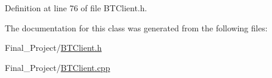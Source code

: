 Definition at line 76 of file B\-T\-Client.\-h.



The documentation for this class was generated from the following files\-:\begin{DoxyCompactItemize}
\item 
Final\-\_\-\-Project/\hyperlink{BTClient_8h}{B\-T\-Client.\-h}\item 
Final\-\_\-\-Project/\hyperlink{BTClient_8cpp}{B\-T\-Client.\-cpp}\end{DoxyCompactItemize}
